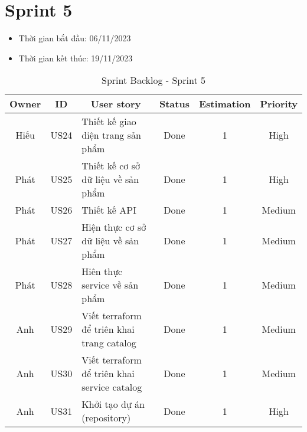 \section{Sprint 5}
\begin{itemize}
    \item Thời gian bắt đầu: 06/11/2023
    \item Thời gian kết thúc: 19/11/2023
\end{itemize}
\begin{table}[H]
    \begin{tabular}{|c|c|m{6cm}|c|c|c|}
    \hline
    \textbf{Owner} & \textbf{ID} & \multicolumn{1}{c|}{\textbf{User story}}                                & \textbf{Status} & \textbf{Estimation} & \textbf{Priority} \\ \hline
    Hiếu         & US24        & Thiết kế giao diện trang sản phẩm                     & Done            & 1                   & High           \\ \hline
    Phát          & US25        & Thiết kế cơ sở dữ liệu về sản phẩm                     & Done            & 1                   & High           \\ \hline
    Phát          & US26        & Thiết kế API                      & Done            & 1                   & Medium          \\ \hline
    Phát         & US27        & Hiện thực cơ sở dữ liệu về sản phẩm                     & Done            & 1                   & Medium          \\ \hline
    Phát          & US28        & Hiên thực service về sản phẩm                     & Done            & 1                   & Medium          \\ \hline
    Anh         & US29        & Viết terraform để triên khai trang catalog                     & Done            & 1                   & Medium          \\ \hline
    Anh          & US30        & Viết terraform để triên khai service catalog                     & Done            & 1                   & Medium          \\ \hline
    Anh          & US31        & Khởi tạo dự án (repository)                    & Done            & 1                   & High           \\ \hline
    \end{tabular}
    \caption{Sprint Backlog - Sprint 5}
    \label{tab:sprint-5}
\end{table}
